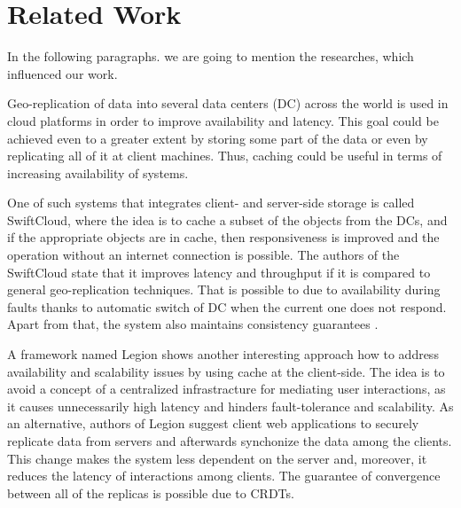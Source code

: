 \chapter{Related Work}
\label{RelatedWork}

In the following paragraphs. we are going to mention the researches, which influenced our work.

Geo-replication of data into several data centers (DC) across the world is used in cloud platforms in order to improve availability and latency\cite{6}. This goal could be achieved even to a greater extent by storing some part of the data or even by replicating all of it at client machines. Thus, caching could be useful in terms of increasing availability of systems.

One of such systems that integrates client- and server-side storage is called SwiftCloud, where the idea is to cache a subset of the objects from the DCs, and if the appropriate objects are in cache, then responsiveness is improved and the operation without an internet connection is possible\cite{5}. The authors of the SwiftCloud state that it improves latency and throughput if it is compared to general geo-replication techniques. That is possible to due to availability during faults thanks to automatic switch of DC when the current one does not respond. Apart from that, the system also maintains consistency guarantees \cite{7}.

A framework named Legion shows another interesting approach how to address availability and scalability issues by using cache at the client-side. The idea is to avoid a concept of a centralized infrastracture for mediating user interactions, as it causes unnecessarily high latency and hinders fault-tolerance and scalability\cite{8}. As an alternative, authors of Legion suggest client web applications to securely replicate data from servers and afterwards synchonize the data among the clients. This change makes the system less dependent on the server and, moreover, it reduces the latency of interactions among clients. The guarantee of convergence between all of the replicas is possible due to CRDTs. 